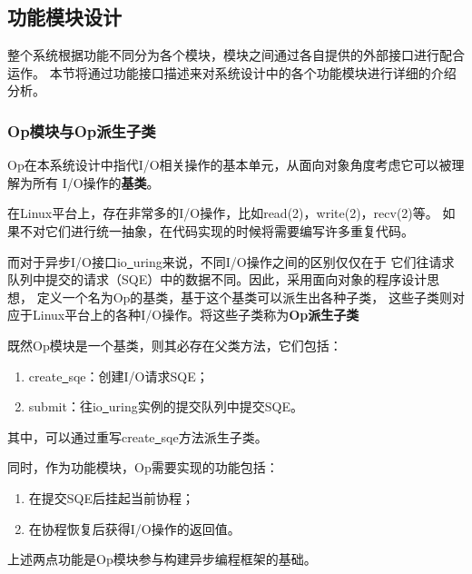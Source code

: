 \documentclass[supercite]{HustGraduPaper}
\theoremstyle{definition}
\begin{document}
\subsection{功能模块设计}
整个系统根据功能不同分为各个模块，模块之间通过各自提供的外部接口进行配合运作。
本节将通过功能接口描述来对系统设计中的各个功能模块进行详细的介绍分析。\par

\subsubsection{Op模块与Op派生子类}

Op在本系统设计中指代I/O相关操作的基本单元，从面向对象\cite{burton2003teaching}角度考虑它可以被理解为所有
I/O操作的\textbf{基类}。\par

在Linux平台上，存在非常多的I/O操作，比如read(2)，write(2)，recv(2)等。
如果不对它们进行统一抽象，在代码实现的时候将需要编写许多重复代码。\par

而对于异步I/O接口io\underline{~}uring来说，不同I/O操作之间的区别仅仅在于
它们往请求队列中提交的请求（SQE）中的数据不同。因此，采用面向对象的程序设计思想，
定义一个名为Op的基类，基于这个基类可以派生出各种子类，
这些子类则对应于Linux平台上的各种I/O操作。将这些子类称为\textbf{Op派生子类}\par

既然Op模块是一个基类，则其必存在父类方法，它们包括：

\begin{enumerate}[label={(\arabic*)}]
  \item create\underline{~}sqe：创建I/O请求SQE；
  \item submit：往io\underline{~}uring实例的提交队列中提交SQE。
\end{enumerate}

其中，可以通过重写create\underline{~}sqe方法派生子类。\par

同时，作为功能模块，Op需要实现的功能包括：

\begin{enumerate}[label={(\arabic*)}]
  \item 在提交SQE后挂起当前协程；
  \item 在协程恢复后获得I/O操作的返回值。
\end{enumerate}

上述两点功能是Op模块参与构建异步编程框架的基础。\par
\end{document}
